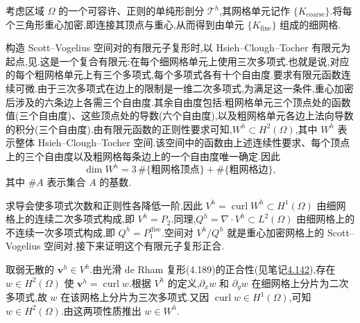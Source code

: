 \begin{example}\label{ex:barycentric-refinement-scott-vogelius}
考虑区域 $\Omega$ 的一个可容许、正则的单纯形剖分 $\mathcal{T}^h$,其网格单元记作 $\{K_{\mathrm{coarse}}\}$.将每个三角形重心加密,即连接其顶点与重心,从而得到由单元 $\{K_{\mathrm{fine}}\}$ 组成的细网格.

构造 Scott--Vogelius 空间对的有限元子复形时,以 Hsieh--Clough--Tocher 有限元为起点,见\textcite{CloughTocher1965,Ciarlet1978}.这是一个复合有限元:在每个细网格单元上使用三次多项式.也就是说,对应的每个粗网格单元上有三个多项式,每个多项式各有十个自由度.要求有限元函数连续可微.由于三次多项式在边上的限制是一维二次多项式,为满足这一条件,重心加密后涉及的六条边上各需三个自由度.其余自由度包括:粗网格单元三个顶点处的函数值(三个自由度)、这些顶点处的导数(六个自由度),以及粗网格单元各边上法向导数的积分(三个自由度).由有限元函数的正则性要求可知,$W^h\subset H^2(\Omega)$,其中 $W^h$ 表示整体 Hsieh--Clough--Tocher 空间.该空间中的函数由上述连续性要求、每个顶点上的三个自由度以及粗网格每条边上的一个自由度唯一确定.因此
\begin{equation}\label{eq:stokes-hct-dimension}
  \dim W^h=3\,\#\{\text{粗网格顶点}\}+\#\{\text{粗网格边}\},
\end{equation}
其中 $\#A$ 表示集合 $A$ 的基数.

求导会使多项式次数和正则性各降低一阶,因此 $V^h=\operatorname{curl}W^h\subset H^1(\Omega)$ 由细网格上的连续二次多项式构成,即 $V^h=P_2$.同理,$Q^h=\nabla\cdot V^h\subset L^2(\Omega)$ 由细网格上的不连续一次多项式构成,即 $Q^h=P_1^{\mathrm{disc}}$.空间对 $V^h/Q^h$ 就是重心加密网格上的 Scott--Vogelius 空间对.接下来证明这个有限元子复形正合.

取弱无散的 $\bm{v}^h\in V^h$.由光滑 de Rham 复形(4.189)的正合性(见笔记\hyperref[note:stokes-smooth-de-rham-complex]{4.142}),存在 $w\in H^2(\Omega)$ 使 $\bm{v}^h=\operatorname{curl}w$.根据 $V^h$ 的定义,$\partial_x w$ 和 $\partial_y w$ 在细网格上分片为二次多项式,故 $w$ 在该网格上分片为三次多项式.又因 $\operatorname{curl}w\in H^1(\Omega)$,可知 $w\in H^2(\Omega)$.由这两项性质推出 $w\in W^h$.


\end{example}
